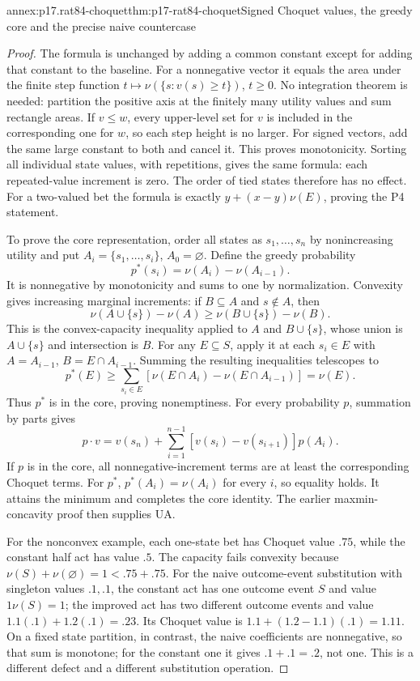 \begin{annexitem}{annex:p17.rat84-choquet}{thm:p17-rat84-choquet}{Signed Choquet values, the greedy core and the precise naive countercase}
\begin{proof}
The formula is unchanged by adding a common constant except
for adding that constant to the baseline. For a nonnegative
vector it equals the area under the finite step function
\(t\mapsto\nu(\{s:v(s)\geq t\})\), \(t\geq0\).
No integration theorem is needed: partition the positive
axis at the finitely many utility values and sum rectangle
areas. If \(v\leq w\), every upper-level set for \(v\)
is included in the corresponding one for \(w\), so each
step height is no larger. For signed vectors, add the same
large constant to both and cancel it. This proves monotonicity.
Sorting all individual state values, with repetitions, gives
the same formula: each repeated-value increment is zero.
The order of tied states therefore has no effect.
For a two-valued bet the formula is exactly
\(y+(x-y)\nu(E)\), proving the P4 statement.

To prove the core representation, order all states as
\(s_1,\ldots,s_n\) by nonincreasing utility and put
\(A_i=\{s_1,\ldots,s_i\}\), \(A_0=\varnothing\).
Define the greedy probability
\[
               p^*(s_i)=\nu(A_i)-\nu(A_{i-1}).
\]
It is nonnegative by monotonicity and sums to one by
normalization. Convexity gives increasing marginal increments:
if \(B\subseteq A\) and \(s\notin A\), then
\[
 \nu(A\cup\{s\})-\nu(A)
                  \geq\nu(B\cup\{s\})-\nu(B).
\]
This is the convex-capacity inequality applied to
\(A\) and \(B\cup\{s\}\), whose union is
\(A\cup\{s\}\) and intersection is \(B\).
For any \(E\subseteq S\), apply it at each \(s_i\in E\)
with \(A=A_{i-1}\), \(B=E\cap A_{i-1}\). Summing the
resulting inequalities telescopes to
\[
 p^*(E)\geq\sum_{s_i\in E}
  [\nu(E\cap A_i)-\nu(E\cap A_{i-1})]=\nu(E).
\]
Thus \(p^*\) is in the core, proving nonemptiness.
For every probability \(p\), summation by parts gives
\[
 p\cdot v=v(s_n)+\sum_{i=1}^{n-1}
                    [v(s_i)-v(s_{i+1})]p(A_i).
\]
If \(p\) is in the core, all nonnegative-increment terms
are at least the corresponding Choquet terms. For \(p^*\),
\(p^*(A_i)=\nu(A_i)\) for every \(i\), so equality holds.
It attains the minimum and completes the core identity.
The earlier maxmin-concavity proof then supplies UA.

For the nonconvex example, each one-state bet has Choquet
value \(.75\), while the constant half act has value \(.5\).
The capacity fails convexity because
\(\nu(S)+\nu(\varnothing)=1<.75+.75\). For the naive
outcome-event substitution with singleton values \(.1,.1\),
the constant act has one outcome event \(S\) and value
\(1\nu(S)=1\); the improved act has two different
outcome events and value \(1.1(.1)+1.2(.1)=.23\).
Its Choquet value is \(1.1+(1.2-1.1)(.1)=1.11\).
On a fixed state partition, in contrast, the naive coefficients
are nonnegative, so that sum is monotone; for the constant
one it gives \(.1+.1=.2\), not one. This is a different
defect and a different substitution operation.
\end{proof}
\end{annexitem}

